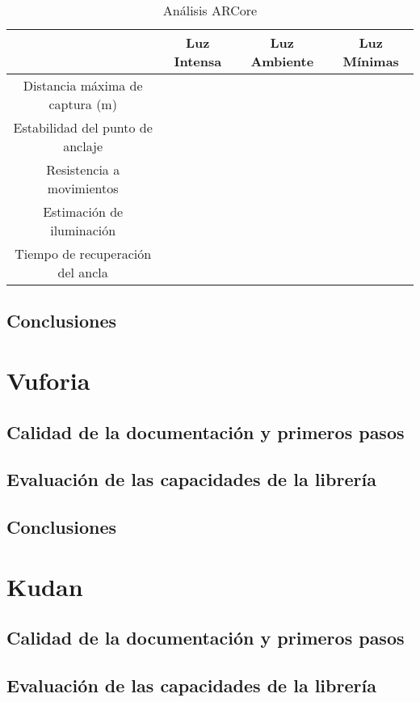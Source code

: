 \begin{table}[H]
\resizebox{\textwidth}{!} {
    \centering
    \begin{tabular}{|c|c|c|c|}
    \hline
         & Luz Intensa & Luz Ambiente & Luz Mínimas \\
         \hline
        Distancia máxima de captura (m) & & &\\
        \hline
        Estabilidad del punto de anclaje & & &\\
        \hline
        Resistencia a movimientos & & & \\
        \hline
        Estimación de iluminación & & & \\
        \hline
        Tiempo de recuperación del ancla & & & \\
      \hline
    \end{tabular}
  }
    \caption{Análisis ARCore}
    \label{tab:TARCore}
\end{table}
\subsection{Conclusiones}

\section{Vuforia}
\subsection{Calidad de la documentación y primeros pasos}

\subsection{Evaluación de las capacidades de la librería}

\subsection{Conclusiones}


\section{Kudan}
\subsection{Calidad de la documentación y primeros pasos}

\subsection{Evaluación de las capacidades de la librería}
